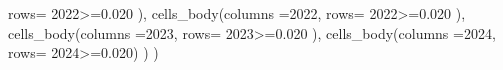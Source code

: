 \documentclass[
  12pt]{article}
\newenvironment{Shaded}{\begin{snugshade}}{\end{snugshade}}
\newcommand{\AttributeTok}[1]{\textcolor[rgb]{0.40,0.45,0.13}{#1}}
\newcommand{\FloatTok}[1]{\textcolor[rgb]{0.68,0.00,0.00}{#1}}
\newcommand{\FunctionTok}[1]{\textcolor[rgb]{0.28,0.35,0.67}{#1}}
\newcommand{\NormalTok}[1]{\textcolor[rgb]{0.00,0.23,0.31}{#1}}
\newcommand{\SpecialCharTok}[1]{\textcolor[rgb]{0.37,0.37,0.37}{#1}}
\newcommand{\StringTok}[1]{\textcolor[rgb]{0.13,0.47,0.30}{#1}}
\theoremstyle{definition}
\theoremstyle{remark}
\begin{document}
\begin{Shaded}
\begin{Highlighting}[]
                 \AttributeTok{rows=} \StringTok{\textasciigrave{}}\AttributeTok{2022}\StringTok{\textasciigrave{}}\SpecialCharTok{\textgreater{}=}\FloatTok{0.020}\NormalTok{  ), }
       \FunctionTok{cells\_body}\NormalTok{(}\AttributeTok{columns =}\StringTok{\textasciigrave{}}\AttributeTok{2022}\StringTok{\textasciigrave{}}\NormalTok{, }
                 \AttributeTok{rows=} \StringTok{\textasciigrave{}}\AttributeTok{2022}\StringTok{\textasciigrave{}}\SpecialCharTok{\textgreater{}=}\FloatTok{0.020}\NormalTok{  ), }
       \FunctionTok{cells\_body}\NormalTok{(}\AttributeTok{columns =}\StringTok{\textasciigrave{}}\AttributeTok{2023}\StringTok{\textasciigrave{}}\NormalTok{, }
                 \AttributeTok{rows=} \StringTok{\textasciigrave{}}\AttributeTok{2023}\StringTok{\textasciigrave{}}\SpecialCharTok{\textgreater{}=}\FloatTok{0.020}\NormalTok{  ), }
      \FunctionTok{cells\_body}\NormalTok{(}\AttributeTok{columns =}\StringTok{\textasciigrave{}}\AttributeTok{2024}\StringTok{\textasciigrave{}}\NormalTok{, }
                 \AttributeTok{rows=} \StringTok{\textasciigrave{}}\AttributeTok{2024}\StringTok{\textasciigrave{}}\SpecialCharTok{\textgreater{}=}\FloatTok{0.020}\NormalTok{)}
\NormalTok{    )}
\NormalTok{  )}
\end{Highlighting}
\end{Shaded}
\end{document}
